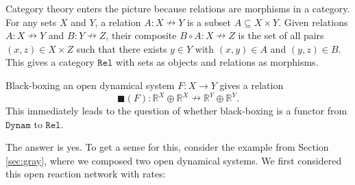 \documentclass{compositionalityarticle}
\newcommand{\R}{\mathbb{R}}
\newcommand{\Dynam}{\mathtt{Dynam}}
\newcommand{\Rel}{\mathtt{Rel}}
\newcommand{\maps}{\colon}
\newcommand{\relto}{\nrightarrow}
\theoremstyle{compositionality}
\theoremstyle{remark}
\begin{document}
Category theory enters the picture because relations are morphisms in a category.  For any sets $X$ and $Y$, a relation $A \maps X \relto Y$ is a subset $A \subseteq X \times Y$.   Given relations $A \maps X \relto Y$ and $B \maps Y \relto Z$, their composite $B \circ A \maps X \relto Z$ is the set of all pairs $(x,z) \in X \times Z$ such that there exists $y \in Y$ with $(x,y) \in A$ and $(y,z) \in B$.   This gives a category $\Rel$ with sets as objects and relations as morphisms.   

Black-boxing an open dynamical system $F \maps X \to Y$ gives a relation
\[   \blacksquare(F) \maps \R^X \oplus \R^X \relto \R^Y \oplus \R^Y  .\]
This immediately leads to the question of whether black-boxing is a functor from $\Dynam$ to 
$\Rel$.  

The answer is yes.  To get a sense for this, consider the example from Section \ref{sec:gray}, where we composed two open dynamical systems.   We first considered this open reaction network with rates:
\end{document}
